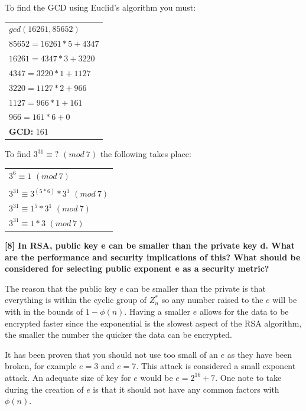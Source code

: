 \documentclass[letterpaper,11pt,notitlepage,fleqn]{article}
\begin{document}
To find the GCD using Euclid's algorithm you must:
\begin{center}
    \begin{tabular}{l}
        $gcd(16261, 85652)$\\
        $85652 = 16261 \ast 5 + 4347$\\
        $16261 = 4347\ast 3 + 3220$ \\
        $4347 = 3220\ast 1 + 1127$ \\
        $3220 = 1127\ast 2 + 966$ \\
        $1127 = 966\ast 1 + 161$ \\
        $966 = 161\ast 6 + 0$ \\
        \textbf{GCD:} $161$\\
    \end{tabular}
\end{center}

To find $3^{31} \equiv ?$ $(mod\ 7)$ the following takes place:
\begin{center}
    \begin{tabular}{l}
        $3^{6} \equiv 1$ $(mod\ 7)$\\ \\
        $3^{31} \equiv 3^{(5 \ast 6)}\ast 3^{1}$ $(mod\ 7)$\\
        $3^{31} \equiv 1^{5}\ast 3^{1}$ $(mod\ 7)$\\
        $3^{31} \equiv 1 \ast 3$ $(mod\ 7)$\\
    \end{tabular}
\end{center}

\noindent \textbf{[8]  In  RSA,  public  key  e  can  be  smaller  than  the  private  key  d.  What  are  the performance  and  security  implications  of  this?  What  should  be  considered  for selecting public exponent e as a security metric?}

The reason that the public key $e$ can be smaller than the private is that everything is within the cyclic group of $Z_{n}^{*}$ so any number raised to the $e$ will be with in the bounds of $1-\phi(n)$.
Having a smaller $e$ allows for the data to be encrypted faster since the exponential is the slowest aspect of the RSA algorithm, the smaller the number the quicker the data can be encrypted. 

It has been proven that you should not use too small of an $e$ as they have been broken, for example $e=3$ and $e=7$. This attack is considered a small exponent attack. An adequate size of key for $e$ would be $e=2^{16}+7$. One note to take during the creation of $e$ is that it should not have any common factors with $\phi(n)$.   
\end{document}
